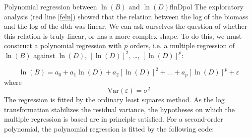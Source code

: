 \begin{filrouge}{Polynomial regression between $\ln(B)$ and $\ln(D)$}{flnDpol}%
The exploratory analysis (red line \ref{feln}) showed that the relation between the log of the biomass and the log of the dbh was linear. We can ask ourselves the question of whether this relation is truly linear, or has a more complex shape. To do this, we must construct a polynomial regression with $p$ orders, i.e. a multiple regression of $\ln(B)$ against $\ln(D)$, $[\ln(D)]^2$, \ldots, $[\ln(D)]^p$:

\[
\ln(B)=a_0+a_1\ln(D)+a_2[\ln(D)]^2+\ldots+a_p[\ln(D)]^p+\varepsilon
\]
where
\[
\mathrm{Var}(\varepsilon)=\sigma^2
\]
The regression is fitted by the ordinary least squares method. As the log transformation stabilizes the residual variance, the hypotheses on which the multiple regression is based are in principle satisfied. For a second-order polynomial, the polynomial regression is fitted by the following code:


\end{filrouge}
